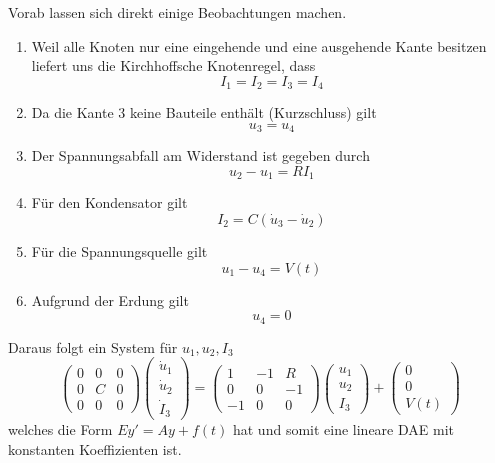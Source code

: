 \documentclass[11pt,titlepage]{article}
\begin{document}
		Vorab lassen sich direkt einige Beobachtungen machen.
		\begin{enumerate}
			\item Weil alle Knoten nur eine eingehende und eine ausgehende Kante besitzen liefert uns die Kirchhoffsche Knotenregel, dass
				\begin{displaymath}
					I_1 = I_2 = I_3 = I_4
				\end{displaymath}
			\item Da die Kante 3 keine Bauteile enthält (Kurzschluss) gilt 
				\begin{displaymath}
					u_3 = u_4
				\end{displaymath}
			\item Der Spannungsabfall am Widerstand ist gegeben durch 
				\begin{displaymath}
					u_2 - u_1 = R I_1
				\end{displaymath}
			\item Für den Kondensator gilt
				\begin{displaymath}
					I_2 = C(\dot{u}_3 - \dot{u}_2)
				\end{displaymath}
			\item Für die Spannungsquelle gilt
				\begin{displaymath}
					u_1 - u_4 = V(t)
				\end{displaymath}
			\item Aufgrund der Erdung gilt
				\begin{displaymath}
					u_4 = 0
				\end{displaymath}
		\end{enumerate}
		Daraus folgt ein System für $u_1, u_2, I_3$
		\begin{displaymath}
			\begin{pmatrix}
				0 & 0 & 0 \\
				0 & C & 0 \\
				0 & 0 & 0
			\end{pmatrix}
			\begin{pmatrix}
				\dot{u}_1 \\
				\dot{u}_2 \\
				\dot{I}_3
			\end{pmatrix}
		 	=
		 	\begin{pmatrix}
		 		1 & -1 & R \\
		 		0 & 0 & -1 \\
		 		-1 & 0 & 0
		 	\end{pmatrix}
	 		\begin{pmatrix}
	 			u_1 \\
	 			u_2 \\
	 			I_3 
	 		\end{pmatrix}
 			+
 			\begin{pmatrix}
 				0 \\
 				0 \\
 				V(t)
 			\end{pmatrix}
		\end{displaymath}
		welches die Form $Ey' = Ay + f(t)$ hat und somit eine lineare DAE mit konstanten Koeffizienten ist.
\end{document}

